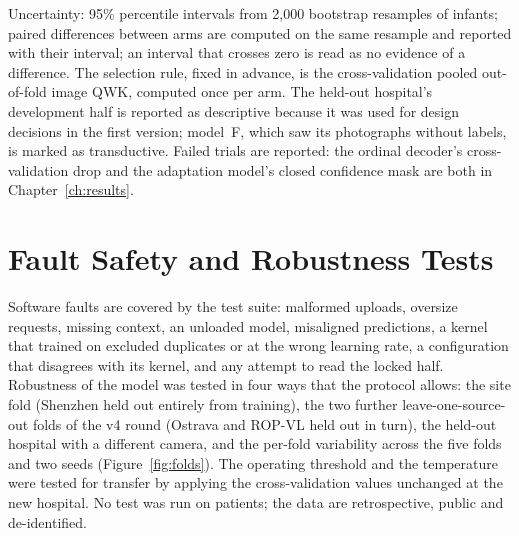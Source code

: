 Uncertainty: 95\% percentile intervals from 2{,}000 bootstrap resamples of infants; paired differences between arms are computed on the same resample and reported with their interval; an interval that crosses zero is read as no evidence of a difference. The selection rule, fixed in advance, is the cross-validation pooled out-of-fold image QWK, computed once per arm. The held-out hospital's development half is reported as descriptive because it was used for design decisions in the first version; model~F, which saw its photographs without labels, is marked as transductive. Failed trials are reported: the ordinal decoder's cross-validation drop and the adaptation model's closed confidence mask are both in Chapter~\ref{ch:results}.

\section{Fault Safety and Robustness Tests}
Software faults are covered by the test suite: malformed uploads, oversize requests, missing context, an unloaded model, misaligned predictions, a kernel that trained on excluded duplicates or at the wrong learning rate, a configuration that disagrees with its kernel, and any attempt to read the locked half. Robustness of the model was tested in four ways that the protocol allows: the site fold (Shenzhen held out entirely from training), the two further leave-one-source-out folds of the v4 round (Ostrava and ROP-VL held out in turn), the held-out hospital with a different camera, and the per-fold variability across the five folds and two seeds (Figure~\ref{fig:folds}). The operating threshold and the temperature were tested for transfer by applying the cross-validation values unchanged at the new hospital. No test was run on patients; the data are retrospective, public and de-identified.
